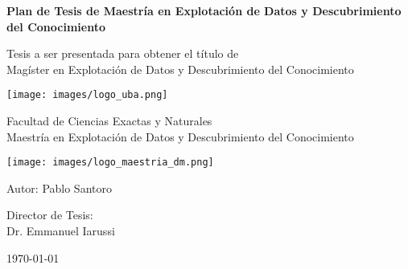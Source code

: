 \begin{titlepage}
    \begin{center}

    \huge
    \textbf{Plan de Tesis de Maestría en Explotación de Datos y Descubrimiento del Conocimiento}
    
    \vspace{0.5cm}
    
    \vfill
    \Large
    Tesis a ser presentada para obtener el título de\\
    Magíster en Explotación de Datos y Descubrimiento del Conocimiento
    
    \vspace{0.5cm}
    
    \texttt{[image: images/logo\_uba.png]}
    
    \vspace{0.5cm}
    \large
    Facultad de Ciencias Exactas y Naturales\\
    Maestría en Explotación de Datos y Descubrimiento del Conocimiento\\
    
    \vspace{0.5cm}
    
    \texttt{[image: images/logo\_maestria\_dm.png]}

    \vspace{0.5cm}
    
    Autor: Pablo Santoro
    
    \vspace{0.5cm}
    
    Director de Tesis:\\
    Dr. Emmanuel Iarussi
    
    {\today}
    
    \end{center}
\end{titlepage}
